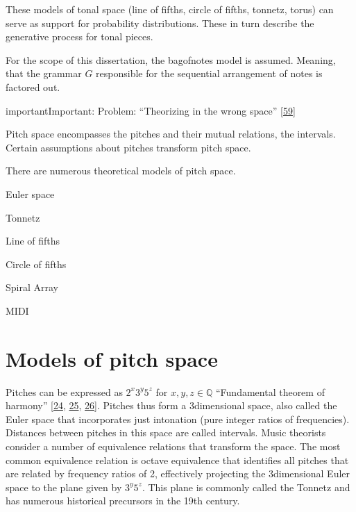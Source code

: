 \documentclass[letterpaper,10pt,english]{sphinxmanual}
\begin{document}
\sphinxAtStartPar
These models of tonal space (line of fifths, circle of fifths, tonnetz,
torus) can serve as support for probability distributions. These in turn
describe the generative process for tonal pieces.

\sphinxAtStartPar
For the scope of this dissertation, the bag\sphinxhyphen{}of\sphinxhyphen{}notes model is assumed.
Meaning, that the grammar \(G\) responsible for the sequential
arrangement of notes is factored out.

\begin{sphinxadmonition}{important}{Important:}
\sphinxAtStartPar
Problem: “Theorizing in the wrong space” {[}\hyperlink{cite.8_bibliography:id6}{59}{]}
\end{sphinxadmonition}

\sphinxAtStartPar
Pitch space encompasses the pitches and their mutual relations, the
intervals. Certain assumptions about pitches transform pitch space.

\sphinxAtStartPar
There are numerous theoretical models of pitch space.

\begin{DUlineblock}{0em}
\item[] \sphinxhyphen{} Euler space
\item[] \sphinxhyphen{} Tonnetz
\item[] \sphinxhyphen{} Line of fifths
\item[] \sphinxhyphen{} Circle of fifths
\item[] \sphinxhyphen{} Spiral Array
\item[] \sphinxhyphen{} MIDI
\end{DUlineblock}


\section{Models of pitch space}
\label{\detokenize{5_notes:models-of-pitch-space}}
\sphinxAtStartPar
Pitches can be expressed as \(2^x3^y5^z\) for
\(x,y,z\in \mathbb Q\) “Fundamental theorem of harmony”
{[}\hyperlink{cite.8_bibliography:id36}{24}, \hyperlink{cite.8_bibliography:id37}{25}, \hyperlink{cite.8_bibliography:id35}{26}{]}.
Pitches thus form a
3\sphinxhyphen{}dimensional space, also called the Euler space that incorporates just
intonation (pure integer ratios of frequencies). Distances between
pitches in this space are called intervals. Music theorists consider a
number of equivalence relations that transform the space. The most
common equivalence relation is octave equivalence that identifies all
pitches that are related by frequency ratios of 2, effectively
projecting the 3\sphinxhyphen{}dimensional Euler space to the plane given by
\(3^y5^z\). This plane is commonly called the Tonnetz and has
numerous historical precursors in the 19th century.
\end{document}
